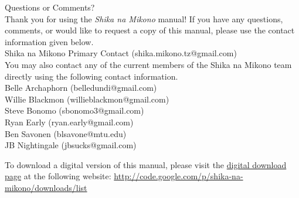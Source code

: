 \begin{center}
{\Huge Questions or Comments?}\\[12pt]
Thank you for using the \textit{Shika na Mikono} manual! If you have any questions, comments, or would like to request a copy of this manual, please use the contact information given below.\\[20pt]
Shika na Mikono Primary Contact (shika.mikono.tz@gmail.com)\\[20pt]
You may also contact any of the current members of the Shika na Mikono team directly using the following contact information.\\[20pt]
Belle Archaphorn (belledundi@gmail.com)\\
Willie Blackmon (willieblackmon@gmail.com)\\
Steve Bonomo (sbonomo3@gmail.com)\\
Ryan Early (ryan.early@gmail.com)\\
Ben Savonen (blsavone@mtu.edu)\\







JB Nightingale (jbsucks@gmail.com)\\


\end{center}
\vfill
To download a digital version of this manual, please visit the \href{http://code.google.com/p/shika-na-mikono/downloads/list}{digital download page} at the following website: \url{http://code.google.com/p/shika-na-mikono/downloads/list}